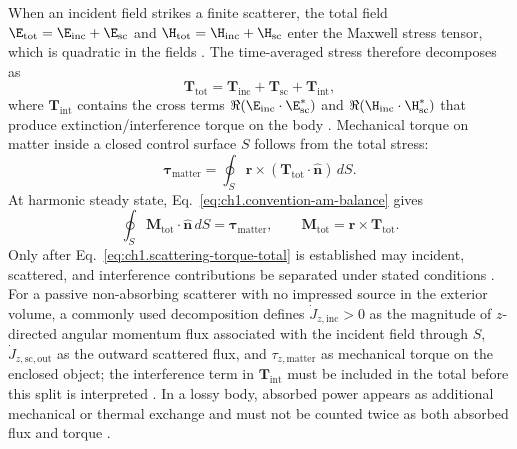 When an incident field strikes a finite scatterer, the total field $\E_{\mathrm{tot}}=\E_{\mathrm{inc}}+\E_{\mathrm{sc}}$ and $\H_{\mathrm{tot}}=\H_{\mathrm{inc}}+\H_{\mathrm{sc}}$ enter the Maxwell stress tensor, which is quadratic in the fields \cite{stratton1941,beth1936}. The time-averaged stress therefore decomposes as
\begin{equation}
\label{eq:ch1.stress-total-decomposition}
\mathbf{T}_{\mathrm{tot}}
=
\mathbf{T}_{\mathrm{inc}}
+\mathbf{T}_{\mathrm{sc}}
+\mathbf{T}_{\mathrm{int}},
\end{equation}
where $\mathbf{T}_{\mathrm{int}}$ contains the cross terms
$\Re(\E_{\mathrm{inc}}\cdot\E_{\mathrm{sc}}^*)$ and $\Re(\H_{\mathrm{inc}}\cdot\H_{\mathrm{sc}}^*)$ that produce extinction/interference torque on the body \cite{stratton1941,beth1936}. Mechanical torque on matter inside a closed control surface $S$ follows from the total stress:
\begin{equation}
\label{eq:ch1.scattering-torque-total}
\boldsymbol{\tau}_{\mathrm{matter}}
=\oint_{S}\mathbf{r}\times(\mathbf{T}_{\mathrm{tot}}\cdot\hat{\mathbf{n}})\,dS.
\end{equation}
At harmonic steady state, Eq.~\eqref{eq:ch1.convention-am-balance} gives
\begin{equation}
\label{eq:ch1.scattering-am-balance-general}
\oint_{S}\mathbf{M}_{\mathrm{tot}}\cdot\hat{\mathbf{n}}\,dS
=\boldsymbol{\tau}_{\mathrm{matter}},
\qquad
\mathbf{M}_{\mathrm{tot}}=\mathbf{r}\times\mathbf{T}_{\mathrm{tot}}.
\end{equation}
Only after Eq.~\eqref{eq:ch1.scattering-torque-total} is established may incident, scattered, and interference contributions be separated under stated conditions \cite{beth1936,stratton1941}. For a passive non-absorbing scatterer with no impressed source in the exterior volume, a commonly used decomposition defines $\dot J_{z,\mathrm{inc}}>0$ as the magnitude of $z$-directed angular momentum flux associated with the incident field through $S$, $\dot J_{z,\mathrm{sc,out}}$ as the outward scattered flux, and $\tau_{z,\mathrm{matter}}$ as mechanical torque on the enclosed object; the interference term in $\mathbf{T}_{\mathrm{int}}$ must be included in the total before this split is interpreted \cite{beth1936}. In a lossy body, absorbed power appears as additional mechanical or thermal exchange and must not be counted twice as both absorbed flux and torque \cite{stratton1941}.


